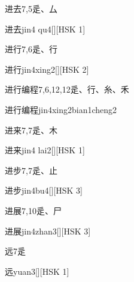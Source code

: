 \begin{entry}{进去}{7,5}{⾡、⼛}
  \begin{phonetics}{进去}{jin4 qu4}[][HSK 1]
  \end{phonetics}
\end{entry}

\begin{entry}{进行}{7,6}{⾡、⾏}
  \begin{phonetics}{进行}{jin4xing2}[][HSK 2]
  \end{phonetics}
\end{entry}

\begin{entry}{进行编程}{7,6,12,12}{⾡、⾏、⽷、⽲}
  \begin{phonetics}{进行编程}{jin4xing2bian1cheng2}
  \end{phonetics}
\end{entry}

\begin{entry}{进来}{7,7}{⾡、⽊}
  \begin{phonetics}{进来}{jin4 lai2}[][HSK 1]
  \end{phonetics}
\end{entry}

\begin{entry}{进步}{7,7}{⾡、⽌}
  \begin{phonetics}{进步}{jin4bu4}[][HSK 3]
  \end{phonetics}
\end{entry}

\begin{entry}{进展}{7,10}{⾡、⼫}
  \begin{phonetics}{进展}{jin4zhan3}[][HSK 3]
  \end{phonetics}
\end{entry}

\begin{entry}{远}{7}{⾡}
  \begin{phonetics}{远}{yuan3}[][HSK 1]
  \end{phonetics}
\end{entry}

